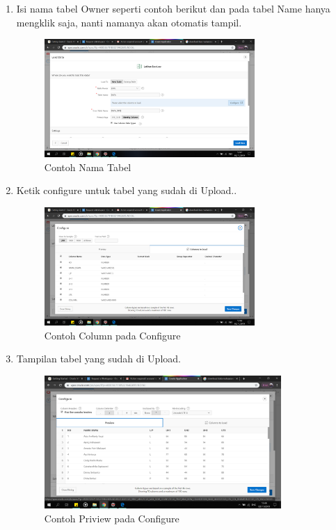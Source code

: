 \begin{enumerate}
\item Isi nama tabel Owner seperti contoh berikut dan pada tabel Name hanya mengklik saja, nanti namanya akan otomatis tampil.
    \begin{figure}[!htbp]
    \centering
    \includegraphics[width=8cm]{picture/22.png}
    \caption{Contoh Nama Tabel}
    \end{figure}

    
\item Ketik configure untuk tabel yang sudah di Upload..
    \begin{figure}[!htbp]
    \centering
    \includegraphics[width=8cm]{picture/23.png}
    \caption{Contoh Column pada Configure}
    \end{figure}
    
\newpage    
\item Tampilan tabel yang sudah di Upload.
\begin{figure}[!htbp]
    \centering
    \includegraphics[width=9cm]{picture/24.png}
    \caption{Contoh Priview pada Configure}
    \end{figure}
    

\end{enumerate}
